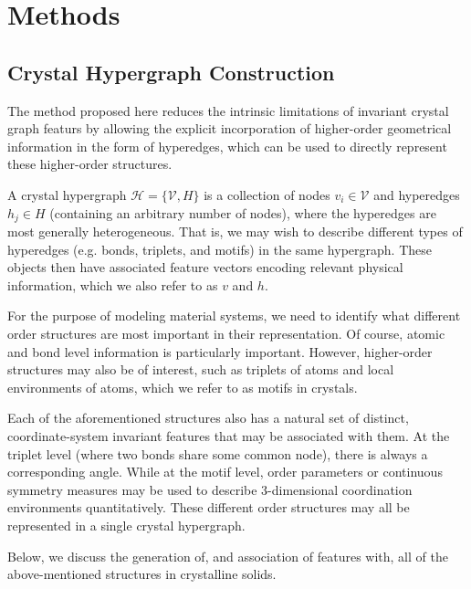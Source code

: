 \documentclass[10pt,a4paper,twocolumn]{article}
\begin{document}
\section{Methods}

\subsection{Crystal Hypergraph Construction}
The method proposed here reduces the intrinsic limitations of invariant crystal graph featurs by allowing the explicit incorporation of higher-order geometrical information in the form of hyperedges, which can be used to directly represent these higher-order structures.


A crystal hypergraph $\mathcal{H}=\lbrace\mathcal{V}, \mathit{H} \rbrace$ is a collection of nodes $v_i\in \mathcal{V}$ and hyperedges $h_j\in \mathit{H}$ (containing an arbitrary number of nodes), where the hyperedges are most generally heterogeneous. That is, we may wish to describe different types of hyperedges (e.g. bonds, triplets, and motifs) in the same hypergraph. These objects then have associated feature vectors encoding relevant physical information, which we also refer to as $v$ and $h$.

For the purpose of modeling material systems, we need to identify what different order structures are most important in their representation. Of course, atomic and bond level information is particularly important. However, higher-order structures may also be of interest, such as triplets of atoms and local environments of atoms, which we refer to as motifs in crystals.

Each of the aforementioned structures also has a natural set of distinct, coordinate-system invariant features that may be associated with them. At the triplet level (where two bonds share some common node), there is always a corresponding angle. While at the motif level, order parameters \cite{orderparam1, orderparam2} or continuous symmetry measures \cite{csm_polyhedra, chemenv} may be used to describe 3-dimensional coordination environments quantitatively. 
These different order structures may all be represented in a single crystal hypergraph. 



Below, we discuss the generation of, and association of features with, all of the above-mentioned structures in crystalline solids. 
\end{document}
